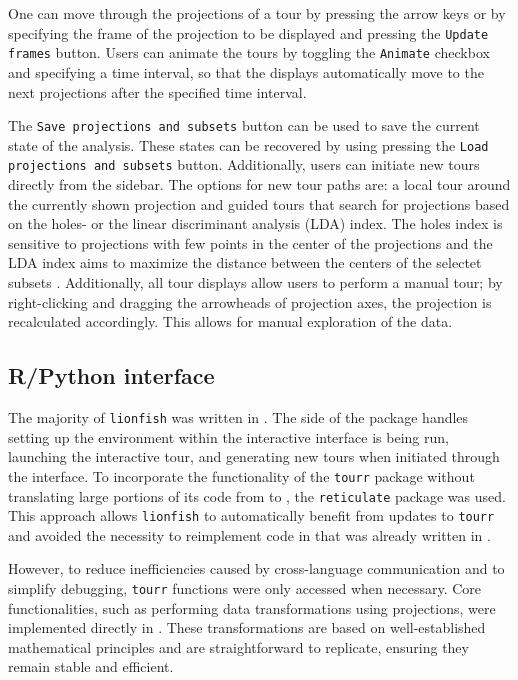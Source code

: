\documentclass[article]{ajs}
\begin{document}
One can move through the projections of a tour by pressing the arrow keys or by specifying the frame of the projection to be displayed and pressing the \texttt{Update frames} button. Users can animate the tours by toggling the \texttt{Animate} checkbox and specifying a time interval, so that the displays automatically move to the next projections after the specified time interval.

The \texttt{Save projections and subsets} button can be used to save the current state of the analysis. These states can be recovered by using pressing the \texttt{Load projections and subsets} button. Additionally, users can initiate new tours directly from the sidebar. The options for new tour paths are: a local tour around the currently shown projection and guided tours that search for projections based on the holes- or the linear discriminant analysis (LDA) index. The holes index is sensitive to projections with few points in the center of the projections and the LDA index aims to maximize the distance between the centers of the selectet subsets \citep{ggobi}. Additionally, all tour displays allow users to perform a manual tour; by right-clicking and dragging the arrowheads of projection axes, the projection is recalculated accordingly. This allows for manual exploration of the data.

\subsection{R/Python interface}

The majority of \texttt{lionfish} was written in  \citep{python}. The  \citep{R} side of the package handles setting up the  environment within the interactive interface is being run, launching the interactive tour, and generating new tours when initiated through the interface. To incorporate the functionality of the \texttt{tourr} package without translating large portions of its code from  to , the \texttt{reticulate} package was used. This approach allows \texttt{lionfish} to automatically benefit from updates to \texttt{tourr} and avoided the necessity to reimplement code in  that was already written in .

However, to reduce inefficiencies caused by cross-language communication and to simplify debugging, \texttt{tourr} functions were only accessed when necessary. Core functionalities, such as performing data transformations using projections, were implemented directly in . These transformations are based on well-established mathematical principles and are straightforward to replicate, ensuring they remain stable and efficient.
\end{document}
